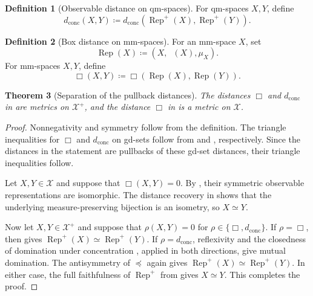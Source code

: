 \documentclass{amsart}
\theoremstyle{plain}
\newtheorem{theorem}{Theorem}[section]
\theoremstyle{definition}
\newtheorem{definition}[theorem]{Definition}
\theoremstyle{remark}
\newcommand{\X}{\mathcal{X}}
\newcommand{\Xp}{\mathcal{X}^{+}}
\DeclareMathOperator{\lipone}{Lip_1}
\newcommand{\dconc}{d_{\operatorname{conc}}}
\begin{document}
\begin{definition}[Observable distance on qm-spaces]
\label{def:pullback-observable-distance}
For qm-spaces $X,Y$, define
\[\dconc(X,Y)\coloneqq\dconc(\operatorname{Rep}^{+}(X),\operatorname{Rep}^{+}(Y)).\]
\end{definition}

\begin{definition}[Box distance on mm-spaces]
\label{def:pullback-mm-box-distance}
For an mm-space $X$, set
\[\operatorname{Rep}(X)\coloneqq(X,\lipone(X),\mu_X).\]
For mm-spaces $X,Y$, define
\[\Box(X,Y)\coloneqq\Box(\operatorname{Rep}(X),\operatorname{Rep}(Y)).\]
\end{definition}

\begin{theorem}[Separation of the pullback distances]
\label{thm:pullback-metrics}
The distances $\Box$ and $\dconc$ in  are metrics on $\Xp$, and the distance $\Box$ in  is a metric on $\X$.
\end{theorem}

\begin{proof}
Nonnegativity and symmetry follow from the definition. The triangle inequalities for $\Box$ and $\dconc$ on gd-sets follow from \cite[Proposition~5.13]{gds1} and \cite[Theorem~3.10]{hanika2022gds}, respectively. Since the distances in the statement are pullbacks of these gd-set distances, their triangle inequalities follow.

Let $X,Y\in\X$ and suppose that $\Box(X,Y)=0$. By \cite[Proposition~5.13]{gds1}, their symmetric observable representations are isomorphic. The distance recovery in  shows that the underlying measure-preserving bijection is an isometry, so $X\simeq Y$.

Now let $X,Y\in\Xp$ and suppose that $\rho(X,Y)=0$ for $\rho\in\{\Box,\dconc\}$. If $\rho=\Box$, then \cite[Proposition~5.13]{gds1} gives $\operatorname{Rep}^{+}(X)\simeq\operatorname{Rep}^{+}(Y)$. If $\rho=\dconc$, reflexivity and the closedness of domination under concentration \cite[Theorem~4.16]{gds1}, applied in both directions, give mutual domination. The antisymmetry of $\preceq$ \cite[Proposition~3.9]{gds1} again gives $\operatorname{Rep}^{+}(X)\simeq\operatorname{Rep}^{+}(Y)$. In either case, the full faithfulness of $\operatorname{Rep}^{+}$ from  gives $X\simeq Y$.
This completes the proof.
\end{proof}
\end{document}
